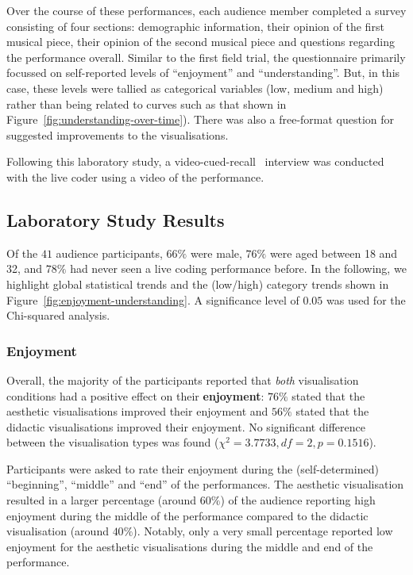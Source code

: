 \documentclass{sig-alternate}
\begin{document}
Over the course of these performances, each audience member completed
a survey consisting of four sections: demographic information, their
opinion of the first musical piece, their opinion of the second
musical piece and questions regarding the performance overall. Similar
to the first field trial, the questionnaire primarily focussed on
self-reported levels of ``enjoyment'' and ``understanding''. But, in
this case, these levels were tallied as categorical variables (low,
medium and high) rather than being related to curves such as that
shown in Figure~\ref{fig:understanding-over-time}). There was also a
free-format question for suggested improvements to the visualisations.

Following this laboratory study, a
video-cued-recall~\citep{Suchman1992} interview was conducted with
the live coder using a video of the performance.

\subsection*{Laboratory Study Results}

Of the $41$ audience participants, $66\%$ were male, $76\%$ were aged
between 18 and 32, and $78\%$ had never seen a live coding performance
before. In the following, we highlight global statistical trends and
the (low/high) category trends shown in
Figure~\ref{fig:enjoyment-understanding}. A significance level of
$0.05$ was used for the Chi-squared analysis.

\subsubsection*{Enjoyment}

Overall, the majority of the participants reported that \emph{both}
visualisation conditions had a positive effect on their
\textbf{enjoyment}: $76\%$ stated that the aesthetic visualisations
improved their enjoyment and $56\%$ stated that the didactic
visualisations improved their enjoyment. No significant difference
between the visualisation types  was found
($\chi^2=3.7733,df=2,p=0.1516$).

Participants were asked to rate their enjoyment during the
(self-determined) ``beginning'', ``middle'' and ``end'' of the
performances. The aesthetic visualisation resulted in a larger
percentage (around $60\%$) of the audience reporting high enjoyment
during the middle of the performance compared to the didactic
visualisation (around $40\%$). Notably, only a very small percentage
reported low enjoyment for the aesthetic visualisations during the
middle and end of the performance.
\end{document}
